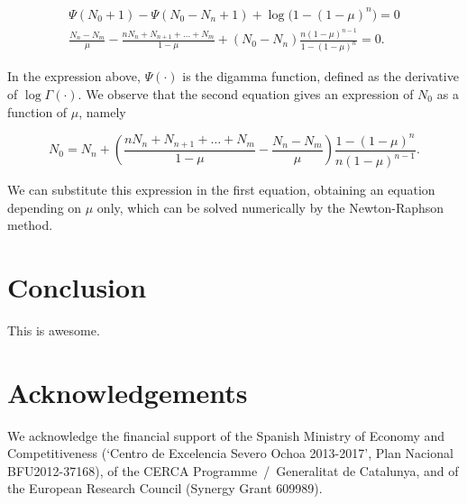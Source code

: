 \documentclass{article}
\begin{document}
\begin{gather*}
\Psi(N_0+1)-\Psi(N_0-N_n+1) + \log\big( 1-(1-\mu)^n \big) = 0 \\
\frac{N_n-N_m}{\mu}
-\frac{nN_n + N_{n+1}+\ldots+N_m}{1-\mu} +
(N_0-N_n)\frac{n(1-\mu)^{n-1}}{1-(1-\mu)^n} = 0.
\end{gather*}

In the expression above, $\Psi(\cdot)$ is the digamma function, defined as
the derivative of $\log \Gamma(\cdot)$. We observe that the second
equation gives an expression of $N_0$ as a function of $\mu$, namely

\begin{equation*}
N_0 = N_n +
\left(\frac{nN_n+N_{n+1}+\ldots+N_m}{1-\mu}-
\frac{N_n-N_m}{\mu} \right)
\frac{1-(1-\mu)^n}{n(1-\mu)^{n-1}}.
\end{equation*}

We can substitute this expression in the first equation, obtaining an
equation depending on $\mu$ only, which can be solved numerically by
the Newton-Raphson method.

\section{Conclusion}

This is awesome.

\section*{Acknowledgements}

We acknowledge the financial support of the Spanish Ministry of Economy
and Competitiveness (‘Centro de Excelencia Severo Ochoa 2013-2017’, Plan
Nacional BFU2012-37168), of the CERCA Programme~/~Generalitat de
Catalunya, and of the European Research Council (Synergy Grant 609989).






\end{document}
